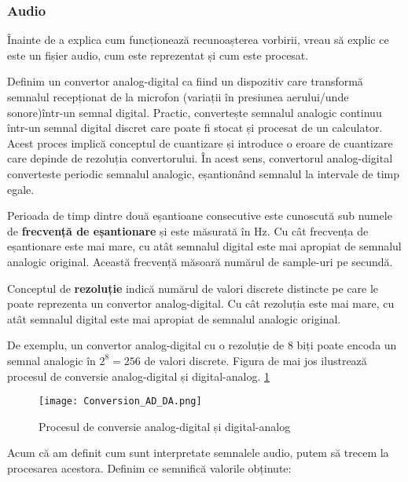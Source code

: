 \subsubsection{Audio}
Înainte de a explica cum funcționează recunoașterea vorbirii, vreau să explic ce este un fișier audio,
cum este reprezentat și cum este procesat.

\par
Definim un convertor analog-digital ca fiind un dispozitiv care transformă semnalul recepționat 
de la microfon (variații în presiunea aerului/unde sonore)într-un semnal digital.
Practic, convertește semnalul analogic continuu într-un
semnal digital discret care poate fi stocat și procesat de un calculator. Acest proces implică
conceptul de cuantizare și introduce o eroare de cuantizare care depinde de rezoluția convertorului.
În acest sens, convertorul analog-digital converteste periodic semnalul analogic, eșantionând semnalul
la intervale de timp egale.
\par
Perioada de timp dintre două eșantioane consecutive este cunoscută sub numele de \textbf{frecvență de eșantionare}
și este măsurată în Hz. Cu cât frecvența de eșantionare este mai mare, cu atât semnalul digital este mai apropiat
de semnalul analogic original. Această frecvență măsoară numărul de sample-uri pe secundă.
\par
Conceptul de \textbf{rezoluție} indică numărul de valori discrete distincte pe care le poate 
reprezenta un convertor analog-digital. Cu cât rezoluția este mai mare, cu atât semnalul digital
este mai apropiat de semnalul analogic original.
\par
De exemplu, un convertor analog-digital cu o rezoluție de 8 biți poate encoda un semnal analogic
în $2^8 = 256$ de valori discrete. Figura de mai jos ilustrează procesul de conversie analog-digital
și digital-analog. \ref{fig:conversion-ad-da}

\begin{figure}[h]
    \centering
    \texttt{[image: Conversion\_AD\_DA.png]}
    \caption{Procesul de conversie analog-digital și digital-analog\protect\footnotemark[1]}
    \label{fig:conversion-ad-da}
\end{figure}

\par
Acum că am definit cum sunt interpretate semnalele audio, putem să trecem la procesarea acestora.
Definim ce semnifică valorile obținute:

